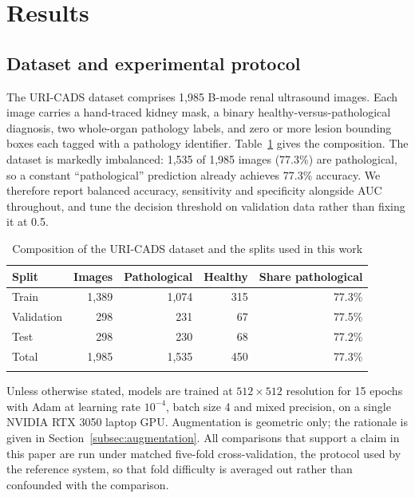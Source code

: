 \documentclass[pdflatex,sn-mathphys-num]{sn-jnl}
\theoremstyle{thmstyleone}%
\theoremstyle{thmstyletwo}%
\theoremstyle{thmstylethree}%
\begin{document}
\section{Results}\label{sec:results}

\subsection{Dataset and experimental protocol}\label{subsec:data}

The URI-CADS dataset comprises 1,985 B-mode renal ultrasound images. Each image carries a
hand-traced kidney mask, a binary healthy-versus-pathological diagnosis, two whole-organ
pathology labels, and zero or more lesion bounding boxes each tagged with a pathology
identifier. Table~\ref{tab:dataset} gives the composition. The dataset is markedly imbalanced:
1,535 of 1,985 images (77.3\%) are pathological, so a constant ``pathological'' prediction
already achieves 77.3\% accuracy. We therefore report balanced accuracy, sensitivity and
specificity alongside AUC throughout, and tune the decision threshold on validation data rather
than fixing it at 0.5.

\begin{table}[h]
\caption{Composition of the URI-CADS dataset and the splits used in this work}\label{tab:dataset}%
\begin{tabular}{@{}lrrrr@{}}
\toprule
Split & Images & Pathological & Healthy & Share pathological \\
\midrule
Train       & 1{,}389 & 1{,}074 & 315 & 77.3\% \\
Validation  &    298  &    231  &  67 & 77.5\% \\
Test        &    298  &    230  &  68 & 77.2\% \\
\midrule
Total       & 1{,}985 & 1{,}535 & 450 & 77.3\% \\
\botrule
\end{tabular}
\end{table}

Unless otherwise stated, models are trained at $512 \times 512$ resolution for 15 epochs with
Adam \cite{bib_adam} at learning rate $10^{-4}$, batch size 4 and mixed precision, on a single
NVIDIA RTX 3050 laptop GPU. Augmentation is geometric only; the rationale is given in
Section~\ref{subsec:augmentation}. All comparisons that support a claim in this paper are run
under matched five-fold cross-validation, the protocol used by the reference system, so that
fold difficulty is averaged out rather than confounded with the comparison.
\end{document}
